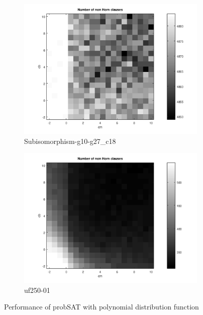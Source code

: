 \documentclass[12pt,a4paper]{article}
\begin{document}
\begin{figure}[H]\ContinuedFloat
  \begin{subfigure}{0.5\textwidth}
    \includegraphics[width=\textwidth]{probSAT/probSATpoly_Subisomorphism-g10-g27_c18[SKIP=0].png}
    \caption{Subisomorphism-g10-g27\_c18}
  \end{subfigure}
  \begin{subfigure}{0.5\textwidth}
    \includegraphics[width=\textwidth]{probSAT/probSATpoly_uf250-01[SKIP=0].png}
    \caption{uf250-01}
  \end{subfigure}
  \caption{Performance of probSAT with polynomial distribution function}
  \label{fig:probSAT_poly}
\end{figure}
\end{document}
